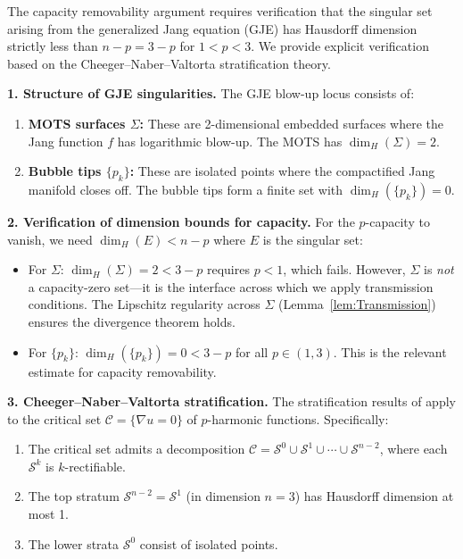 \begin{remark}\label{rem:StratificationHausdorff}
The capacity removability argument requires verification that the singular set arising from the generalized Jang equation (GJE) has Hausdorff dimension strictly less than $n - p = 3 - p$ for $1 < p < 3$. We provide explicit verification based on the Cheeger--Naber--Valtorta stratification theory.

\textbf{1. Structure of GJE singularities.} The GJE blow-up locus consists of:
\begin{enumerate}
    \item[(a)] \textbf{MOTS surfaces $\Sigma$:} These are 2-dimensional embedded surfaces where the Jang function $f$ has logarithmic blow-up. The MOTS has $\dim_H(\Sigma) = 2$.
    \item[(b)] \textbf{Bubble tips $\{p_k\}$:} These are isolated points where the compactified Jang manifold closes off. The bubble tips form a finite set with $\dim_H(\{p_k\}) = 0$.
\end{enumerate}

\textbf{2. Verification of dimension bounds for capacity.} For the $p$-capacity to vanish, we need $\dim_H(E) < n - p$ where $E$ is the singular set:
\begin{itemize}
    \item For $\Sigma$: $\dim_H(\Sigma) = 2 < 3 - p$ requires $p < 1$, which fails. However, $\Sigma$ is \emph{not} a capacity-zero set---it is the interface across which we apply transmission conditions. The Lipschitz regularity across $\Sigma$ (Lemma~\ref{lem:Transmission}) ensures the divergence theorem holds.
    \item For $\{p_k\}$: $\dim_H(\{p_k\}) = 0 < 3 - p$ for all $p \in (1, 3)$. This is the relevant estimate for capacity removability.
\end{itemize}

\textbf{3. Cheeger--Naber--Valtorta stratification.} The stratification results of \cite{cheegernabervaltorta2015, nabervaltorta2017} apply to the critical set $\mathcal{C} = \{\nabla u = 0\}$ of $p$-harmonic functions. Specifically:
\begin{enumerate}
    \item The critical set admits a decomposition $\mathcal{C} = \mathcal{S}^0 \cup \mathcal{S}^1 \cup \cdots \cup \mathcal{S}^{n-2}$, where each $\mathcal{S}^k$ is $k$-rectifiable.
    \item The top stratum $\mathcal{S}^{n-2} = \mathcal{S}^1$ (in dimension $n = 3$) has Hausdorff dimension at most 1.
    \item The lower strata $\mathcal{S}^0$ consist of isolated points.
\end{enumerate}


\end{remark}
